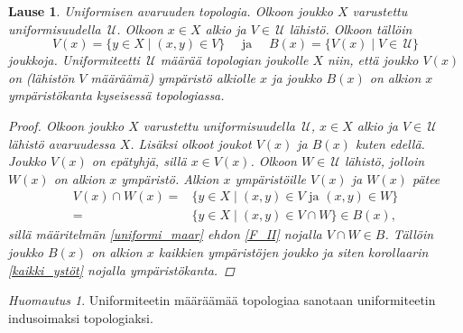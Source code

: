 \documentclass[12pt,a4paper,leqno]{report}
\newcommand{\U}{\,\mathcal{U}}
\theoremstyle{plain}
\newtheorem{lause}[equation]{Lause}
\theoremstyle{definition}
\theoremstyle{remark}
\newtheorem{huom}[equation]{Huomautus}
\begin{document}
\begin{lause}
Uniformisen avaruuden topologia.
Olkoon joukko $X$ varustettu uniformisuudella $\U$.
Olkoon $x\in X$ 
alkio ja $V\in\U$ lähistö. 
Olkoon tällöin %
\begin{equation*}V(x)=\{ y\in X\mid (x,y)\in V \}
\quad\text{ ja }\quad
B(x)=\{ V(x)\mid V\in\U \}
\end{equation*}
joukkoja.
Uniformiteetti $\U$ määrää topologian joukolle $X$ niin, 
että joukko $V(x)$ on (lähistön $V$ määräämä) ympäristö 
alkiolle $x$ ja joukko $B(x)$ on alkion $x$ 
ympäristökanta kyseisessä topologiassa.
\begin{proof}
Olkoon joukko $X$ varustettu uniformisuudella $\U$, 
$x\in X$ alkio ja $V\in\U$ lähistö avaruudessa $X$. Lisäksi olkoot joukot $V(x)$ ja $B(x)$ kuten edellä. 
%
Joukko $V(x)$ on epätyhjä, sillä $x\in V(x)$.
Olkoon $W\in\U$ lähistö, jolloin $W(x)$ on alkion $x$ ympäristö. 
Alkion $x$ ympäristöille $V(x)$ ja $W(x)$ pätee
\begin{align*}
V(x)\cap W(x) =&\{ y\in X\mid (x,y)\in V \text{ ja } (x,y)\in W \}\\
=&\{ y\in X\mid (x,y)\in V\cap W \}
\in B(x),
\end{align*} 
sillä määritelmän \ref{uniformi_maar} ehdon \ref{F_II} 
nojalla $ V\cap W \in B$. 
Tällöin joukko $B(x)$ on alkion $x$ kaikkien ympäristöjen joukko ja siten 
korollaarin \ref{kaikki_ystöt} nojalla ympäristökanta.
\end{proof}
\end{lause}
\begin{huom}
Uniformiteetin määräämää topologiaa sanotaan uniformiteetin indusoimaksi topologiaksi.
\end{huom}
\end{document}

